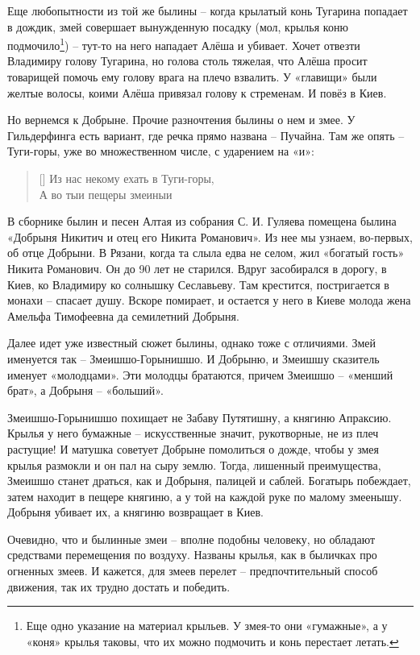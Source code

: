Еще любопытности из той же былины – когда крылатый конь Тугарина попадает в дождик, змей совершает вынужденную посадку (мол, крылья коню подмочило\footnote{Еще одно указание на материал крыльев. У змея-то они «гумажные», а у «коня» крылья таковы, что их можно подмочить и конь перестает летать.}) – тут-то на него нападает Алёша и убивает. Хочет отвезти Владимиру голову Тугарина, но голова столь тяжелая, что Алёша просит товарищей помочь ему голову врага на плечо взвалить. У «главищи» были желтые волосы, коими Алёша привязал голову к стременам. И повёз в Киев.

Но вернемся к Добрыне. Прочие разночтения былины о нем и змее. У Гильдерфинга есть вариант, где речка прямо названа – Пучайна. Там же опять – Туги-горы, уже во множественном числе, с ударением на «и»:

\settowidth{\versewidth}{Из нас некому ехать в Туги-горы,} 
\begin{verse}[\versewidth]
Из нас некому ехать в Туги-горы,\\
А во тыи пещеры змеиныи\\
\end{verse}

В сборнике былин и песен Алтая\cite{gulyaev01} из собрания С. И. Гуляева помещена былина «Добрыня Никитич и отец его Никита Романович». Из нее мы узнаем, во-первых, об отце Добрыни. В Рязани, когда та слыла едва не селом, жил «богатый гость» Никита Романович. Он до 90 лет не старился. Вдруг засобирался в дорогу, в Киев, ко Владимиру ко солнышку Сеславьеву. Там крестится, постригается в монахи – спасает душу. Вскоре помирает, и остается у него в Киеве молода жена Амельфа Тимофеевна да семилетний Добрыня. 

Далее идет уже известный сюжет былины, однако тоже с отличиями. Змей именуется так – Змеишшо-Горыни\-шшо. И Добрыню, и Змеишшу сказитель именует «молодцами». Эти молодцы братаются, причем Змеишшо – «менший брат», а Добрыня – «больший».  

Змеишшо-Горынишшо похищает не Забаву Путятишну, а княгиню Апраксию. Крылья у него бумажные – искусственные значит, рукотворные, не из плеч растущие! И матушка советует Добрыне помолиться о дожде, чтобы у змея крылья размокли и он пал на сыру землю. Тогда, лишенный преимущества, Змеишшо станет драться, как и Добрыня, палицей и саблей. Богатырь побеждает, затем находит в пещере княгиню, а у той на каждой руке по малому змеенышу. Добрыня убивает их, а княгиню возвращает в Киев.

Очевидно, что и былинные змеи – вполне подобны человеку, но обладают средствами перемещения по воздуху. Названы крылья, как в быличках про огненных змеев. И кажется, для змеев перелет – предпочтительный способ движения, так их трудно достать и победить.

